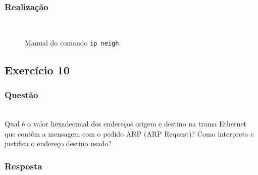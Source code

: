 \documentclass{llncs}
\begin{document}
\subsubsection{Realização}\rule[-10pt]{0pt}{10pt}\\

\begin{figure}
  \caption{Manual do comando \texttt{ip neigh}.}
  \label{fig:ip_neigh}
\end{figure}


\clearpage
\subsection{Exercício 10}
\subsubsection{Questão}\rule[-10pt]{0pt}{10pt}\\

Qual é o valor hexadecimal dos endereços origem e destino na trama Ethernet que contém a mensagem com o pedido ARP (ARP Request)? Como interpreta e justifica o endereço destino usado?

\subsubsection{Resposta}\rule[-10pt]{0pt}{10pt}\\
\end{document}
